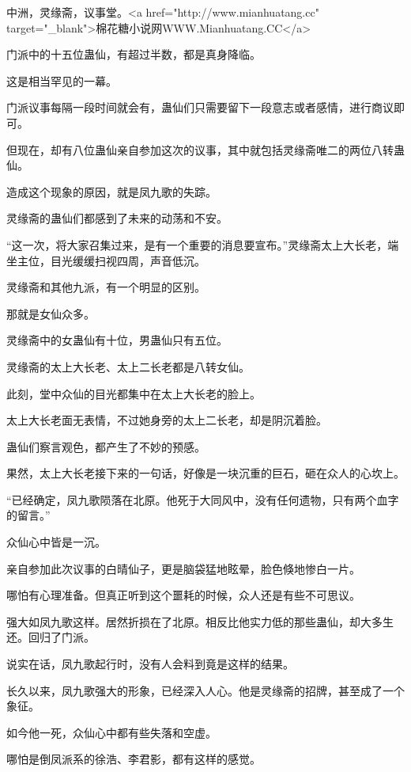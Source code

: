 
\begin{this_body}

中洲，灵缘斋，议事堂。<a href="http://www.mianhuatang.cc" target="\_blank">棉花糖小说网WWW.Mianhuatang.CC</a>

门派中的十五位蛊仙，有超过半数，都是真身降临。

这是相当罕见的一幕。

门派议事每隔一段时间就会有，蛊仙们只需要留下一段意志或者感情，进行商议即可。

但现在，却有八位蛊仙亲自参加这次的议事，其中就包括灵缘斋唯二的两位八转蛊仙。

造成这个现象的原因，就是凤九歌的失踪。

灵缘斋的蛊仙们都感到了未来的动荡和不安。

“这一次，将大家召集过来，是有一个重要的消息要宣布。”灵缘斋太上大长老，端坐主位，目光缓缓扫视四周，声音低沉。

灵缘斋和其他九派，有一个明显的区别。

那就是女仙众多。

灵缘斋中的女蛊仙有十位，男蛊仙只有五位。

灵缘斋的太上大长老、太上二长老都是八转女仙。

此刻，堂中众仙的目光都集中在太上大长老的脸上。

太上大长老面无表情，不过她身旁的太上二长老，却是阴沉着脸。

蛊仙们察言观色，都产生了不妙的预感。

果然，太上大长老接下来的一句话，好像是一块沉重的巨石，砸在众人的心坎上。

“已经确定，凤九歌陨落在北原。他死于大同风中，没有任何遗物，只有两个血字的留言。”

众仙心中皆是一沉。

亲自参加此次议事的白晴仙子，更是脑袋猛地眩晕，脸色倏地惨白一片。

哪怕有心理准备。但真正听到这个噩耗的时候，众人还是有些不可思议。

强大如凤九歌这样。居然折损在了北原。相反比他实力低的那些蛊仙，却大多生还。回归了门派。

说实在话，凤九歌起行时，没有人会料到竟是这样的结果。

长久以来，凤九歌强大的形象，已经深入人心。他是灵缘斋的招牌，甚至成了一个象征。

如今他一死，众仙心中都有些失落和空虚。

哪怕是倒凤派系的徐浩、李君影，都有这样的感觉。


\end{this_body}
